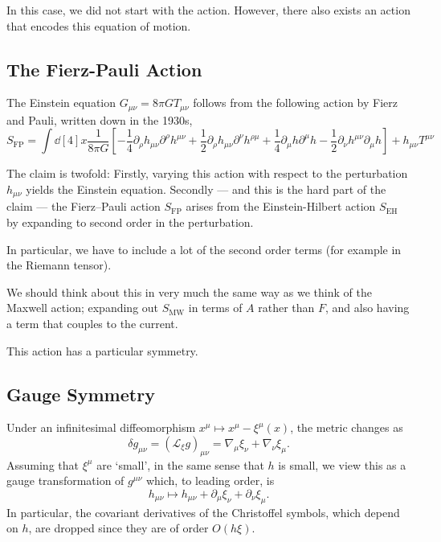 In this case, we did not start with the action. However, there also exists an action that encodes this equation of motion.

\subsection{The Fierz-Pauli Action}%
\label{sub:the_fierz_pauli_action}

The Einstein equation $G_{\mu\nu} = 8 \pi G T_{\mu\nu}$  follows from the following action by Fierz and Pauli, written down in the 1930s, 
\begin{equation}
  S_{\text{FP}} = \int \dd[4]{x} \frac{1}{8\pi G} \left[ - \frac{1}{4} \partial_{\rho} h_{\mu\nu} \partial^{\rho} h^{\mu\nu} + \frac{1}{2} \partial_{\rho} h_{\mu\nu} \partial^{\nu} h^{\rho\mu} + \frac{1}{4} \partial_{\mu} h \partial^{\mu} h - \frac{1}{2} \partial_{\nu} h^{\mu\nu} \partial_{\mu} h \right] + h_{\mu\nu} T^{\mu\nu}
\end{equation}

The claim is twofold: Firstly, varying this action with respect to the perturbation $h_{\mu\nu}$ yields the Einstein equation. Secondly --- and this is the hard part of the claim --- the Fierz--Pauli action $S_{\text{FP}}$ arises from the Einstein-Hilbert action $S_{\text{EH}}$ by expanding to second order in the perturbation.

In particular, we have to include a lot of the second order terms (for example in the Riemann tensor).

We should think about this in very much the same way as we think of the Maxwell action; expanding out $S_{\text{MW}}$  in terms of $A$ rather than  $F$, and also having a term that couples to the current.

This action has a particular symmetry.

\subsection{Gauge Symmetry}%
\label{sub:gauge_symmetry}

Under an infinitesimal diffeomorphism $x^{\mu} \mapsto x^{\mu} - \xi^{\mu} (x)$, the metric changes as 
\begin{equation}
  \delta g_{\mu\nu} = (\mathcal{L}_{\xi} g)_{\mu\nu} = \nabla_{\mu} \xi_{\nu} + \nabla_{\nu} \xi_{\mu}.
\end{equation}
Assuming that $\xi^{\mu}$ are `small', in the same sense that $h$ is small, we view this as a gauge transformation of $g^{\mu\nu}$ which, to leading order, is
\begin{equation}
  h_{\mu\nu} \mapsto h_{\mu\nu} + \partial_{\mu} \xi_{\nu} + \partial_{\nu} \xi_{\mu}.
\end{equation}
In particular, the covariant derivatives of the Christoffel symbols, which depend on $h$, are dropped since they are of order $O(h \xi)$.

